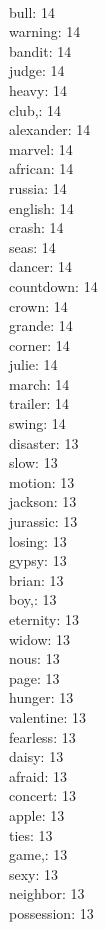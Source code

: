 \begin{multicols}{6}
  \\ bull: 14
  \\ warning: 14
  \\ bandit: 14
  \\ judge: 14
  \\ heavy: 14
  \\ club,: 14
  \\ alexander: 14
  \\ marvel: 14
  \\ african: 14
  \\ russia: 14
  \\ english: 14
  \\ crash: 14
  \\ seas: 14
  \\ dancer: 14
  \\ countdown: 14
  \\ crown: 14
  \\ grande: 14
  \\ corner: 14
  \\ julie: 14
  \\ march: 14
  \\ trailer: 14
  \\ swing: 14
  \\ disaster: 13
  \\ slow: 13
  \\ motion: 13
  \\ jackson: 13
  \\ jurassic: 13
  \\ losing: 13
  \\ gypsy: 13
  \\ brian: 13
  \\ boy,: 13
  \\ eternity: 13
  \\ widow: 13
  \\ nous: 13
  \\ page: 13
  \\ hunger: 13
  \\ valentine: 13
  \\ fearless: 13
  \\ daisy: 13
  \\ afraid: 13
  \\ concert: 13
  \\ apple: 13
  \\ ties: 13
  \\ game,: 13
  \\ sexy: 13
  \\ neighbor: 13
  \\ possession: 13

\end{multicols}
